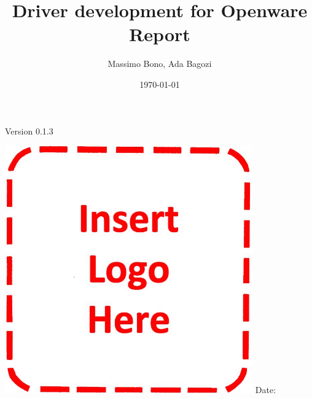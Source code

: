 \documentclass[oneside]{book}
\title{Driver development for Openware Report}
\author{Massimo Bono, Ada Bagozi}
\date{\today}
\begin{document}
\begin{titlepage}
    \centering
    \vfill
    {\bfseries\Large
        \makeatletter\@title\makeatother
        
        \vskip2cm

        \makeatletter\@author\makeatother
        
        \vskip2cm

        Version 0.1.3
        \\
    }    
    \vfill
    \includegraphics[width=0.8\textwidth]{src/images/logo}
    \vfill
    \vfill
    Date: \makeatletter\@date\makeatother
\end{titlepage}
\clearpage

\frontmatter

\tableofcontents
\clearpage

\listoffigures
\clearpage

 
\listoftables
\clearpage

\printglossary[type=\acronymtype]
\clearpage



\mainmatter


\clearpage


\backmatter

\printglossary[type={terms}]
\clearpage
\backmatter


\end{document}
